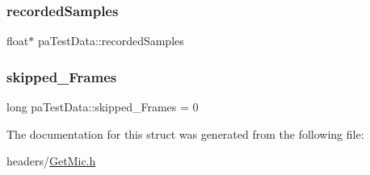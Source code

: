 \mbox{\label{structpa_test_data_a7d998f00d501e39a7ef025d79d6f918a}} 
\subsubsection{\texorpdfstring{recorded\+Samples}{recordedSamples}}
{\footnotesize\ttfamily float$\ast$ pa\+Test\+Data\+::recorded\+Samples}

\mbox{\label{structpa_test_data_af13ba02098a7902306287407c18ef88f}} 
\subsubsection{\texorpdfstring{skipped\+\_\+\+Frames}{skipped\_Frames}}
{\footnotesize\ttfamily long pa\+Test\+Data\+::skipped\+\_\+\+Frames = 0}



The documentation for this struct was generated from the following file\+:\begin{DoxyCompactItemize}
\item 
headers/\hyperlink{_get_mic_8h}{Get\+Mic.\+h}\end{DoxyCompactItemize}
